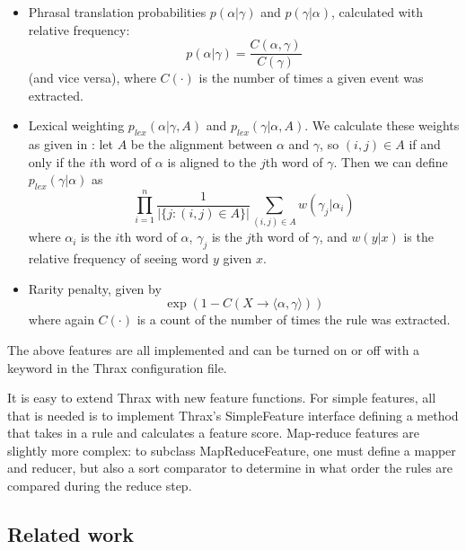 \documentclass[11pt]{article}
\begin{document}
\begin{itemize}
\item Phrasal translation probabilities $p(\alpha|\gamma)$ and
  $p(\gamma|\alpha)$, calculated with relative frequency:
\begin{equation}
p(\alpha|\gamma) = \frac{C(\alpha,\gamma)}{C(\gamma)}
\end{equation}
(and vice versa), where $C(\cdot)$ is the number of times a given
event was extracted.
\item Lexical weighting $p_{\textit{lex}}(\alpha|\gamma,A)$ and $p_{\textit{lex}}(\gamma|\alpha,A)$. We calculate these weights as given in \cite{koehn2003}: let $A$ be the alignment between $\alpha$ and $\gamma$, so $(i,j) \in A$ if and only if the $i$th word of $\alpha$ is aligned to the $j$th word of $\gamma$. Then we can define $p_{\textit{lex}}(\gamma|\alpha)$ as
\begin{equation}
\prod_{i=1}^n{\frac{1}{|\{j : (i,j) \in A\}|}\sum_{(i,j) \in A}{w(\gamma_j|\alpha_i)}}
\end{equation}
where $\alpha_i$ is the $i$th word of $\alpha$, $\gamma_j$ is the
$j$th word of $\gamma$, and $w(y|x)$ is the relative frequency of
seeing word $y$ given $x$. 
\item Rarity penalty, given by
\begin{equation}
\exp(1 - C(X \to \langle \alpha , \gamma \rangle))
\end{equation}
where again $C(\cdot)$ is a count of the number of times the rule was extracted.
\end{itemize}

The above features are all implemented and can be turned on or off
with a keyword in the Thrax configuration file.

It is easy to extend Thrax with new feature functions. For simple features, all that is needed is to implement Thrax's {\sc SimpleFeature} interface defining a method that takes in a rule and calculates a feature score. Map-reduce features are slightly more complex: to subclass {\sc MapReduceFeature}, one must define a mapper and reducer, but also a sort comparator to determine in what order the rules are compared during the reduce step.

\subsection{Related work}

\end{document}
